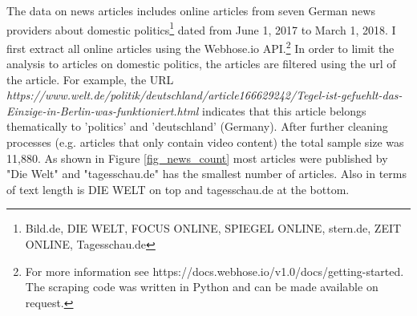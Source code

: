 \documentclass[12pt,a4paper,notitlepage]{article}
\begin{document}
%

The data on news articles includes online articles from seven German news providers about domestic politics\footnote{Bild.de, DIE WELT, FOCUS ONLINE, SPIEGEL ONLINE, stern.de, ZEIT ONLINE, Tagesschau.de} dated from June 1, 2017 to March 1, 2018. I first extract all online articles using the Webhose.io API.\footnote{For more information see https://docs.webhose.io/v1.0/docs/getting-started. The scraping code was written in Python and can be made available on request.} In order to limit the analysis to articles on domestic politics, the articles are filtered using the url of the article. For example, the URL \textit{https://www.welt.de/politik/deutschland/article166629242/Tegel-ist-gefuehlt-das-Einzige-in-Berlin-was-funktioniert.html} indicates that this article belongs thematically to 'politics' and 'deutschland' (Germany). After further cleaning processes (e.g. articles that only contain video content) the total sample size was 11,880. As shown in Figure \ref{fig_news_count} most articles were published by "Die Welt" and "tagesschau.de" has the smallest number of articles. Also in terms of text length is DIE WELT on top and tagesschau.de at the bottom. 
\end{document}
